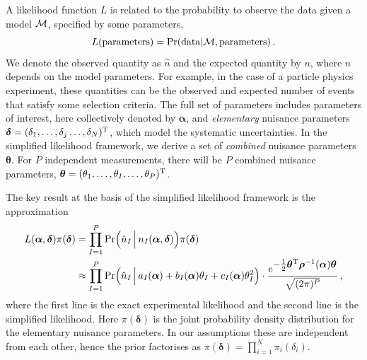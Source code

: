 \documentclass[11pt]{article}
\newcommand{\be}{\begin{equation}}
\newcommand{\ee}{\end{equation}}
\begin{document}
A likelihood function $L$ is related to the probability to observe the data given a model $\cal M$, specified by some parameters,
\be L({\rm parameters})={\rm Pr}({\rm data}|{\cal M},{\rm parameters})\,.\ee
We denote the observed  quantity as $\hat{n}$ and the expected quantity by $n$, where $n$ depends on the model parameters.   For example, in the case of
a particle physics experiment, these quantities can be the observed and expected number of events that satisfy some selection criteria.
The full set of parameters includes parameters of interest, here collectively denoted by $\bm{\alpha}$, and \textit{elementary} nuisance parameters $\bm{\delta}=(\delta_1,\ldots,\delta_{j}\ldots,\delta_N)^{\rm{T}}$, which model the systematic uncertainties.
In the simplified likelihood framework, we derive a set of \textit{combined} nuisance parameters $\bm{\theta}$. For $P$ independent measurements, there will be $P$ combined nuisance parameters, $\bm{\theta}=(\theta_1,\ldots,\theta_{I},\ldots,\theta_P)^{\rm{T}}$.


The key result at the basis of  the simplified likelihood framework is the approximation
\begin{align}
  L(\bm{\alpha},\bm{\delta} )\pi(\bm{\delta})
  & = \prod_{I=1}^P \mathrm{Pr}\Big(  \hat{n}_I\,\Big|\,n_I(\bm{\alpha},\bm{\delta})  \Big) \pi(\bm{\delta}) \label{eq:EL} \\
  & \approx \prod_{I=1}^P \mathrm{Pr}\Big( \hat{n}_I\,\Big|\,a_{I}(\bm \alpha)+b_I(\bm \alpha)\theta_I+c_I(\bm \alpha)\theta_I^2  \Big) \cdot
    \frac{ \mathrm{e}^{{\textstyle-\frac{1}{2}\bm \theta^{\rm T} \bm{\rho}^{-1}(\bm \alpha) \bm \theta}}}{\sqrt{(2\pi)^P }} \,, \label{eq:SL_master}
\end{align}
where the first line is the exact experimental likelihood and the second line is the simplified likelihood. Here $\pi(\bm \delta)$ is the joint probability density distribution for the elementary nuisance parameters. In our assumptions  these are independent from each other, hence the prior factorises as $\pi(\bm \delta)=\prod_{i=1}^N \pi_i(\delta_i)$.
\end{document}
